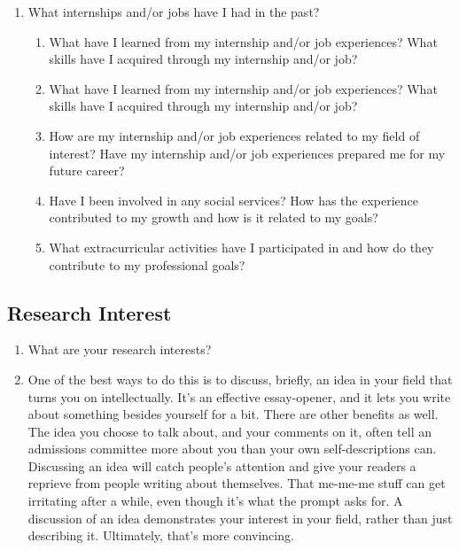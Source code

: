 \documentclass[a4paper,12pt]{article}%
\begin{document}
\begin{enumerate}
	  \hrulefill
	  
\item What internships and/or jobs have I had in the past?
	 \begin{enumerate}
	\item What have I learned from my internship and/or job experiences? What skills have I acquired through my internship and/or job?
	\item 	What have I learned from my internship and/or job experiences? What skills have I acquired through my internship and/or job?
	\item How are my internship and/or job experiences related to my field of interest? Have my internship and/or job experiences prepared me for my future career?
	\item Have I been involved in any social services? How has the experience contributed to my growth and how is it related to my goals?
	\item What extracurricular activities have I participated in and how do they contribute to my professional goals?\\
		  \hrulefill
		  
	  \hrulefill
	  
\end{enumerate}
\end{enumerate}
	  \hrulefill
	  
	  \hrulefill
	  
	  \hrulefill
	  
\subsection{Research Interest}
\label{sec:ResearchInterest}

  \begin{enumerate}
	\item What are your research interests? 
	\item  One of the best ways to do this is to discuss, briefly, an idea in your field that turns you on intellectually. It's an effective essay-opener, and it lets you write about something besides yourself for a bit. There are other benefits as well. The idea you choose to talk about, and your comments on it, often tell an admissions committee more about you than your own self-descriptions can.
Discussing an idea will catch people's attention and give your readers a reprieve from people writing about themselves. That me-me-me  stuff can get irritating after a while, even though it's what the prompt asks for. A discussion of an idea demonstrates your interest in your field, rather than just describing it. Ultimately, that's more convincing.
	\end{enumerate}
		  \hrulefill
		  
\end{document}
